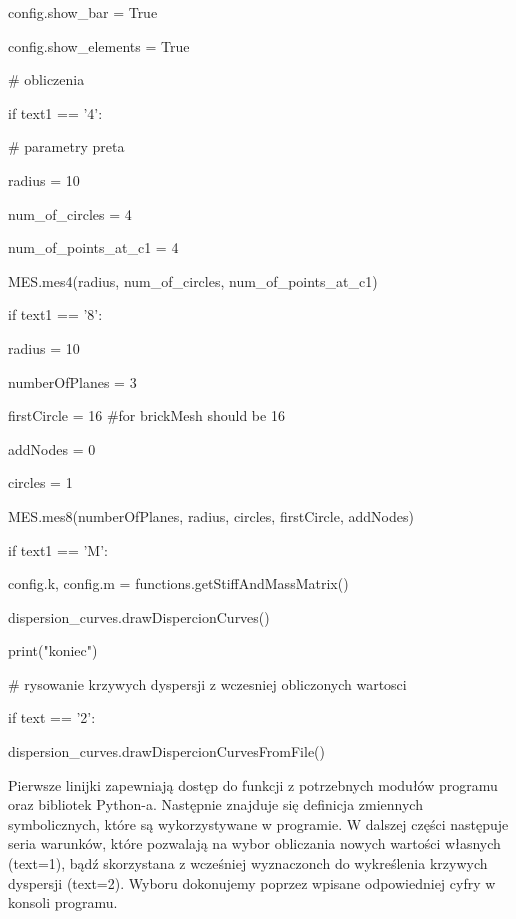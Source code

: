         config.show\_bar = True

        config.show\_elements = True

\vspace{3mm}
        \# obliczenia

        if text1 == '4':

            \# parametry preta

            radius = 10

            num\_of\_circles = 4

            num\_of\_points\_at\_c1 = 4

            MES.mes4(radius, num\_of\_circles, num\_of\_points\_at\_c1)

\vspace{3mm}

        if text1 == '8':

            radius = 10

            numberOfPlanes = 3

            firstCircle = 16 \#for brickMesh should be 16

            addNodes = 0

            circles = 1

            MES.mes8(numberOfPlanes, radius, circles, firstCircle, addNodes)

\vspace{3mm}
        if text1 == 'M':

            config.k, config.m = functions.getStiffAndMassMatrix()

        dispersion\_curves.drawDispercionCurves()

        print("koniec")

\vspace{3mm}
    \# rysowanie krzywych dyspersji z wczesniej obliczonych wartosci

    if text == '2':

        dispersion\_curves.drawDispercionCurvesFromFile()

\vspace{3mm}
Pierwsze linijki zapewniają dostęp do funkcji z potrzebnych modułów programu oraz bibliotek Python-a. Następnie znajduje się definicja zmiennych symbolicznych, które są wykorzystywane w programie. W dalszej części następuje seria warunków, które pozwalają na wybor obliczania nowych wartości własnych (text=1), bądź skorzystana z wcześniej wyznaczonch do wykreślenia krzywych dyspersji (text=2). Wyboru dokonujemy poprzez wpisane odpowiedniej cyfry w konsoli programu. 

